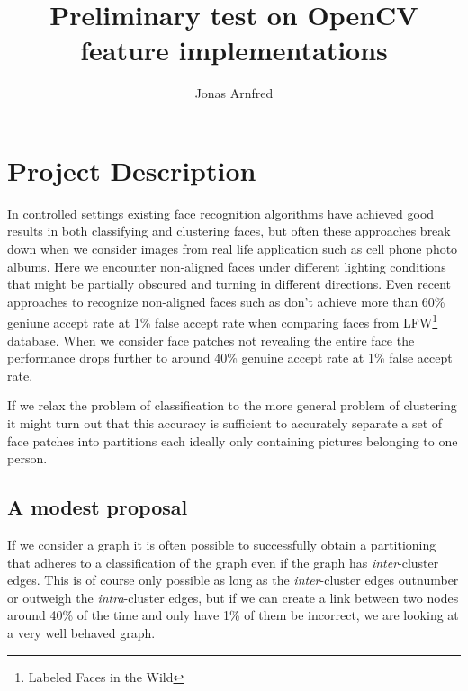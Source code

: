 \documentclass{article}
\begin{document}
\title{Preliminary test on OpenCV feature implementations}
\author{Jonas Arnfred}

\maketitle

\begin{abstract}
\end{abstract}

\section{Project Description} 
In controlled settings existing face recognition
algorithms have achieved good results in both classifying and clustering faces,
but often these approaches break down when we consider images from real life 
application such as cell phone photo albums. Here we encounter non-aligned 
faces under different lighting conditions that might be partially obscured and 
turning in different directions. Even recent approaches to recognize 
non-aligned faces such as \cite[pp 9.]{liao2011} don't achieve more than 60\% 
geniune accept rate at 1\% false accept rate when comparing faces from 
LFW\footnote{Labeled Faces in the Wild} database. When we consider face patches 
not revealing the entire face the performance drops further to around 40\% 
genuine accept rate at 1\% false accept rate.

If we relax the problem of classification to the more general problem of 
clustering it might turn out that this accuracy is sufficient to accurately 
separate a set of face patches into partitions each ideally only containing 
pictures belonging to one person.

\subsection{A modest proposal}
%
%
If we consider a graph it is often possible to successfully obtain a 
partitioning that adheres to a classification of the graph even if the graph 
has \emph{inter}-cluster edges. This is of course only possible as long as the 
\emph{inter}-cluster edges outnumber or outweigh the \emph{intra}-cluster 
edges, but if we can create a link between two nodes around 40\% of the time 
and only have 1\% of them be incorrect, we are looking at a very well behaved 
graph.
\end{document}
